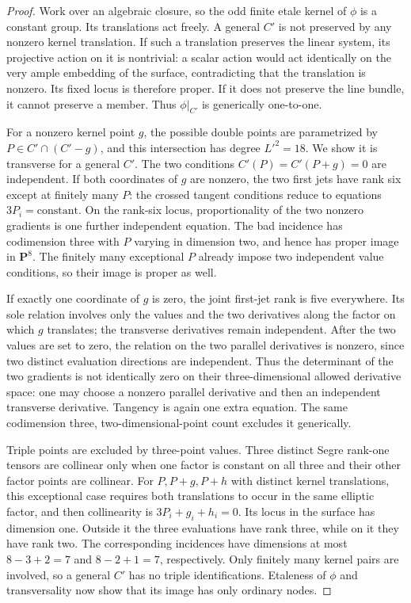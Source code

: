 \begin{proof}
Work over an algebraic closure, so the odd finite etale kernel
of $\phi$ is a constant group. Its translations act freely.
A general $C'$ is not preserved by any nonzero kernel
translation. If such a translation preserves the linear system,
its projective action on it is nontrivial: a scalar action
would act identically on the very ample embedding of the
surface, contradicting that the translation is nonzero.
Its fixed locus is therefore proper. If it does not preserve
the line bundle, it cannot preserve a member.
Thus $\phi|_{C'}$ is generically one-to-one.

For a nonzero kernel point $g$, the possible double points
are parametrized by $P\in C'\cap(C'-g)$, and this intersection
has degree $L'^2=18$. We show it is transverse for a general
$C'$. The two conditions $C'(P)=C'(P+g)=0$ are independent.
If both coordinates of $g$ are nonzero, the two first jets
have rank six except at finitely many $P$: the crossed tangent
conditions reduce to equations $3P_i=\text{constant}$.
On the rank-six locus, proportionality of the two nonzero
gradients is one further independent equation. The bad
incidence has codimension three with $P$ varying in dimension
two, and hence has proper image in $\mathbf P^8$.
The finitely many exceptional $P$ already impose two independent
value conditions, so their image is proper as well.

If exactly one coordinate of $g$ is zero, the joint first-jet
rank is five everywhere. Its sole relation involves only the
values and the two derivatives along the factor on which
$g$ translates; the transverse derivatives remain independent.
After the two values are set to zero, the relation on the two
parallel derivatives is nonzero, since two distinct evaluation
directions are independent. Thus the determinant of the two
gradients is not identically zero on their three-dimensional
allowed derivative space: one may choose a nonzero parallel
derivative and then an independent transverse derivative.
Tangency is again one extra equation. The same codimension
three, two-dimensional-point count excludes it generically.

Triple points are excluded by three-point values.
Three distinct Segre rank-one tensors are collinear only when
one factor is constant on all three and their other factor
points are collinear. For $P,P+g,P+h$ with distinct kernel
translations, this exceptional case requires both translations
to occur in the same elliptic factor, and then collinearity is
$3P_i+g_i+h_i=0$. Its locus in the surface has dimension one.
Outside it the three evaluations have rank three, while on it
they have rank two. The corresponding incidences have dimensions
at most $8-3+2=7$ and $8-2+1=7$, respectively.
Only finitely many kernel pairs are involved, so a general
$C'$ has no triple identifications. Etaleness of $\phi$ and
transversality now show that its image has only ordinary nodes.


\end{proof}
